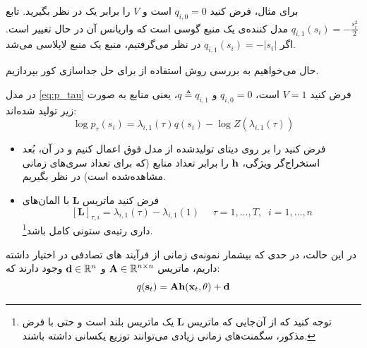 \documentclass[oneside]{thesis}
\begin{document}
\begin{example}
	برای مثال، فرض کنید 
	$q_{i, 0} = 0$
	است و $V$ را برابر یک در نظر بگیرید. تابع
	$q_{i, 1} (s_i) = -\frac{s_i^2}{2}$
	مدل کننده‌ی یک منبع گوسی است که واریانس آن در حال تغییر است. اگر 
	$q_{i, 1} (s_i) = -|s_i|$
	در نظر می‌گرفتیم، منبع یک منبع لاپلاسی می‌شد.
\end{example}

حال می‌خواهیم به بررسی روش استفاده از 
برای حل جداسازی کور بپردازیم.

\begin{theorem}
	در مدل 
	\eqref{eq:p_tau}
	فرض کنید 
	$V = 1$
	است،
	$q_{i, 0} = 0$
	و
	$q \triangleq q_{i, 1}$،
	یعنی منابع به صورت زیر تولید شده‌اند:
	\begin{equation}
	\log p_\tau(s_i)=    \lambda_{i,1}(\tau) q(s_i) - \log Z( \lambda_{i,1}(\tau))
	\label{eq:p_tau_simple}
	\end{equation}
	\begin{itemize}
		\item
		فرض کنید 
		را بر  روی دیتای تولیدشده از مدل فوق اعمال کنیم و در آن، بُعد استخراج‌گر ویژگی، 
		$\mathbf{h}$
		را برابر تعداد منابع (که برای تعداد سری‌های زمانی مشاهده‌شده است) در نظر بگیریم. 
		\item
		فرض کنید ماتریس 
		$\mathbf{L}$
		با المان‌های 
		$$[\mathbf{L}]_{\tau, i} = 
		\lambda_{i, 1}(\tau) - \lambda_{i, 1}(1) \
		\;\;\;\;
		\tau = 1, \dots, T, \;\;
		i = 1, \dots, n
		$$
		داری رتبه‌ی ستونی کامل باشد\footnote{
			توجه کنید که از آن‌جایی که ماتریس 
			$\mathbf{L}$
			یک ماتریس بلند است و حتی با فرض مذکور، سگمنت‌های زمانی زیادی می‌توانند توزیع یکسانی داشته باشند.}.
	\end{itemize}
	در این حالت، در حدی که بیشمار نمونه‌ی زمانی از فرآیند های تصادفی در اختیار داشته داریم، ماتریس 
	$\mathbf{A} \in \mathbb{R}^{n\times n}$
	و
	$\mathbf{d} \in \mathbb{R}^n$
	وجود دارند که:
	\begin{equation}
	q(\mathbf{s}_t) = \mathbf{Ah}(\mathbf{x}_t, \theta) + \mathbf{d}
	\end{equation}
\end{theorem}
\end{document}
